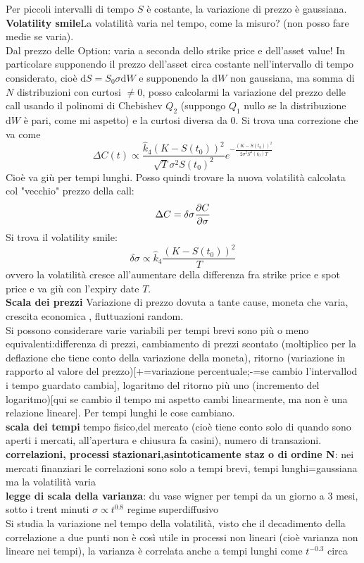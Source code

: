 \documentclass[a4paper,12pt]{article}
\theoremstyle{plain}
\theoremstyle{definition}
\newcommand{\f}[2]{\frac{#1}{#2}}
\renewcommand{\d}{\text{d}}
\theoremstyle{remark}
\begin{document}
Per piccoli intervalli di tempo $S$ è costante, la variazione di prezzo è gaussiana.\\
\textbf{Volatility smile}La volatilità varia nel tempo, come la misuro? (non posso fare medie se varia).\\Dal prezzo delle Option: varia a seconda dello strike price e dell'asset value! In particolare supponendo il prezzo dell'asset circa costante nell'intervallo di tempo considerato, cioè $\d S=S_0 \sigma\d W$  e supponendo la $\d W$ non gaussiana, ma somma di $N$ distribuzioni con curtosi $\ne 0$, posso calcolarmi la variazione del prezzo delle call usando il polinomi di Chebishev $Q_2$ (suppongo $Q_1$ nullo se la distribuzione $\d W$ è pari, come mi aspetto) e la curtosi diversa da 0. Si trova una correzione che va come
\[\Delta C(t)\propto\f{\hat{k}_4(K-S(t_0))^2}{\sqrt{T}\sigma^2S(t_0)^2}	e^{-\f{(K-S(t_0))^2}{2\sigma^2 S^2(t_0)T}}\]
Cioè va giù per tempi lunghi. Posso quindi trovare la nuova volatilità calcolata col "vecchio" prezzo della call:
\[\Delta C=\delta \sigma\pdv{C}{\sigma}\]
Si trova il volatility smile:
\[\delta \sigma\propto \hat{k}_4\f{(K-S(t_0))^2}{T}	\]
ovvero la volatilità cresce all'aumentare della differenza fra strike price e spot price e va giù con l'expiry date $T$.
\\\textbf{Scala dei prezzi} Variazione di prezzo dovuta a tante cause, moneta che varia, crescita economica , fluttuazioni random.\\Si possono considerare varie variabili per tempi brevi sono più o meno  equivalenti:differenza di prezzi, cambiamento di prezzi scontato (moltiplico per la deflazione che tiene conto della variazione della moneta), ritorno  (variazione in rapporto al valore del prezzo)[+=variazione percentuale;-=se cambio l'intervallod i tempo guardato cambia], logaritmo del ritorno più uno (incremento del logaritmo)[qui se cambio il tempo mi aspetto cambi linearmente, ma non è una relazione lineare]. Per tempi lunghi le cose cambiano.
\\\textbf{scala dei tempi} tempo fisico,del mercato (cioè tiene conto solo di quando sono aperti i mercati, all'apertura e chiusura fa casini), numero di transazioni.\\
\textbf{correlazioni, processi stazionari,asintoticamente staz o di ordine N}: nei mercati finanziari le correlazioni sono solo a tempi brevi, tempi lunghi=gaussiana ma la volatilità varia
\\\textbf{legge di scala della varianza}: du vase wigner per tempi da un giorno a 3 mesi, sotto i trent minuti $\sigma\propto t^{0.8}$ regime superdiffusivo\\Si studia la variazione nel tempo della volatilità, visto che il decadimento della correlazione a due punti non è così utile in processi non lineari (cioè varianza non lineare nei tempi), la  varianza è correlata anche a tempi lunghi come $t^{-0.3}$ circa
\end{document}

